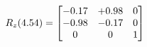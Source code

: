 \documentclass[preview]{standalone}
\begin{document}
\begin{align*}
\special{dvisvgm:raw <g id='unique000'>}R_{z}(4.54) = \begin{bmatrix}-0.17 & +0.98 & 0 \\-0.98 & -0.17 & 0 \\0 & 0 & 1\end{bmatrix}\special{dvisvgm:raw </g>}
\end{align*}
\end{document}
